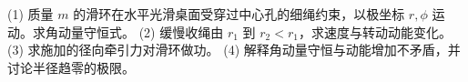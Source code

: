 (1) 质量 \(m\) 的滑环在水平光滑桌面受穿过中心孔的细绳约束，以极坐标 \(r,\phi\) 运动。求角动量守恒式。
(2) 缓慢收绳由 \(r_1\) 到 \(r_2<r_1\)，求速度与转动动能变化。
(3) 求施加的径向牵引力对滑环做功。
(4) 解释角动量守恒与动能增加不矛盾，并讨论半径趋零的极限。
